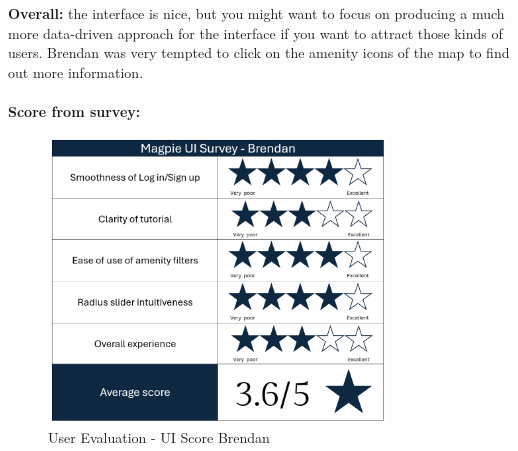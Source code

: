\textbf{Overall: }the interface is nice, but you might want to focus on producing a much more data-driven approach for the interface if you want to attract those kinds of users. Brendan was very tempted to click on the amenity icons of the map to find out more information.\\\\
\textbf{Score from survey: }
\begin{figure}
    \centering
    \includegraphics[width=0.8\textwidth]{images/survey-brendan.png}
    \caption{User Evaluation - UI Score Brendan}
\end{figure}

\newpage
